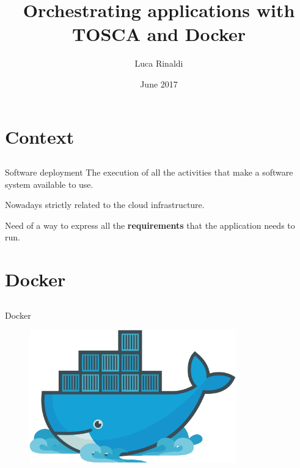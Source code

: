 \documentclass{beamer}
\title[About Beamer] %
{Orchestrating applications with\\ TOSCA and Docker}
\author[lucarin91] %
{Luca Rinaldi}
\institute[unipi] %
{
  {\small University of Pisa}
}
\date[2017] %
{
  {\small June 2017}
}
\begin{document}
\begin{frame}
  \maketitle
\end{frame}


\section{Context}\subsection*{}

  \begin{frame}{Software deployment}
    The execution of all the activities that make a software system available to use.

    Nowadays strictly related to the cloud infrastructure.

    Need of a way to express all the \textbf{requirements} that the application needs to run.
  \end{frame}


\section{Docker}\subsection*{}

  \begin{frame}{Docker}
    \begin{figure}
      \includegraphics[width=0.8\textwidth]{img/docker.png}
    \end{figure}
  \end{frame}
\end{document}
